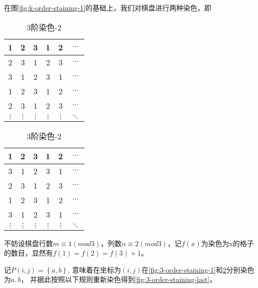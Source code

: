 在图\ref*{fig:k-order-staining-1}的基础上，我们对棋盘进行两种染色，即

\begin{table}[h]
	\caption{3阶染色}
	\label{fig:3-order-staining}
	\begin{subtable}{.5\linewidth}
		\centering
		\caption{3阶染色-1}
		\begin{tabular}{|c|c|c|c|c|c|}
			\hline
			1        & 2        & 3        & 1        & 2        & $\cdots$ \\
			\hline
			2        & 3        & 1        & 2        & 3        & $\cdots$ \\
			\hline
			3        & 1        & 2        & 3        & 1        & $\cdots$ \\
			\hline
			1        & 2        & 3        & 1        & 2        & $\cdots$ \\
			\hline
			2        & 3        & 1        & 2        & 3        & $\cdots$ \\
			\hline
			$\vdots$ & $\vdots$ & $\vdots$ & $\vdots$ & $\vdots$ & $\ddots$ \\
			\hline
		\end{tabular}
		\label{fig:3-order-staining-1}
	\end{subtable}%
	\begin{subtable}{.5\linewidth}
		\centering
		\caption{3阶染色-2}
		\begin{tabular}{|c|c|c|c|c|c|}
			\hline
			1        & 2        & 3        & 1        & 2        & $\cdots$ \\
			\hline
			3        & 1        & 2        & 3        & 1        & $\cdots$ \\
			\hline
			2        & 3        & 1        & 2        & 3        & $\cdots$ \\
			\hline
			1        & 2        & 3        & 1        & 2        & $\cdots$ \\
			\hline
			3        & 1        & 2        & 3        & 1        & $\cdots$ \\
			\hline
			$\vdots$ & $\vdots$ & $\vdots$ & $\vdots$ & $\vdots$ & $\ddots$ \\
			\hline
		\end{tabular}
		\label{fig:3-order-staining-2}
	\end{subtable}
\end{table}

不妨设棋盘行数$m \equiv 1 (mod 3)$，列数$n \equiv 2 (mod 3)$，记$f(x)$为染色为x的格子的数目，显然有$f(1) = f(2) = f(3) + 1$。

记$P(i, j) = \left\{a, b\right\}$, 意味着在坐标为$(i, j)$在\ref*{fig:3-order-staining-1}和\ref*{fig:3-order-staining-2}分别染色为$a, b$，
并据此按照以下规则重新染色得到\ref*{fig:3-order-staining-last}。

